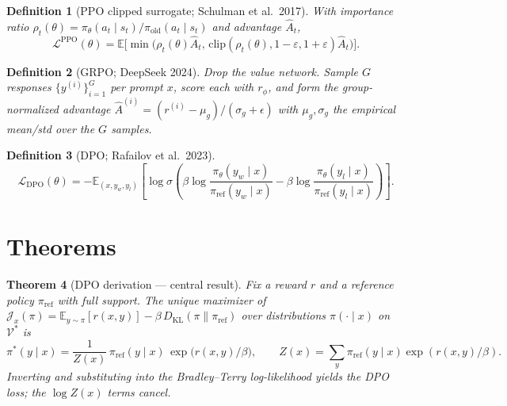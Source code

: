 \documentclass[11pt]{article}
\newtheorem{theorem}{Theorem}[section]
\newtheorem{definition}[theorem]{Definition}
\theoremstyle{remark}
\begin{document}
\begin{definition}[PPO clipped surrogate; Schulman et al.\ 2017]
With importance ratio $\rho_t(\theta)=\pi_\theta(a_t\mid s_t)/\pi_{\mathrm{old}}(a_t\mid s_t)$ and advantage $\hat A_t$,
\[
\mathcal{L}^{\mathrm{PPO}}(\theta) = \mathbb{E}\!\Big[\min\!\big(\rho_t(\theta)\hat A_t,\,\mathrm{clip}(\rho_t(\theta),1-\varepsilon,1+\varepsilon)\hat A_t\big)\Big].
\]
\end{definition}

\begin{definition}[GRPO; DeepSeek 2024]
Drop the value network. Sample $G$ responses $\{y^{(i)}\}_{i=1}^G$ per prompt $x$, score each with $r_\phi$, and form the group-normalized advantage $\hat A^{(i)} = (r^{(i)}-\mu_g)/(\sigma_g+\epsilon)$ with $\mu_g,\sigma_g$ the empirical mean/std over the $G$ samples.
\end{definition}

\begin{definition}[DPO; Rafailov et al.\ 2023]
\[
\mathcal{L}_{\mathrm{DPO}}(\theta) = -\mathbb{E}_{(x,y_w,y_l)}\!\left[\log\sigma\!\left(\beta\log\frac{\pi_\theta(y_w\mid x)}{\pi_{\mathrm{ref}}(y_w\mid x)} - \beta\log\frac{\pi_\theta(y_l\mid x)}{\pi_{\mathrm{ref}}(y_l\mid x)}\right)\right].
\]
\end{definition}

\section*{Theorems}

\begin{theorem}[DPO derivation --- central result]
Fix a reward $r$ and a reference policy $\pi_{\mathrm{ref}}$ with full support. The unique maximizer of
$\mathcal{J}_x(\pi)=\mathbb{E}_{y\sim\pi}[r(x,y)]-\beta\,D_{\mathrm{KL}}(\pi\|\pi_{\mathrm{ref}})$
over distributions $\pi(\cdot\mid x)$ on $\mathcal{V}^*$ is
\[
\pi^*(y\mid x) = \frac{1}{Z(x)}\,\pi_{\mathrm{ref}}(y\mid x)\,\exp\!\big(r(x,y)/\beta\big),\qquad Z(x)=\sum_y\pi_{\mathrm{ref}}(y\mid x)\exp(r(x,y)/\beta).
\]
Inverting and substituting into the Bradley--Terry log-likelihood yields the DPO loss; the $\log Z(x)$ terms cancel.
\end{theorem}
\end{document}
